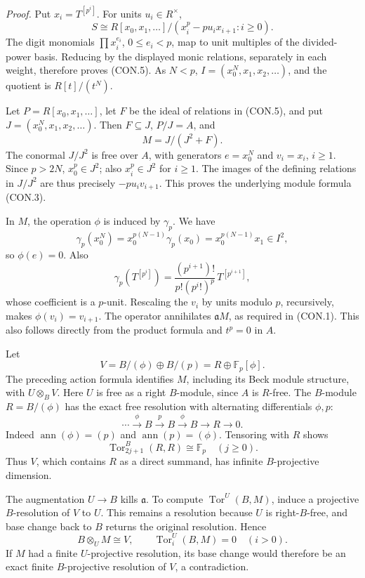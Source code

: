 \emph{Proof.}
Put \(x_i=T^{[p^i]}\). For units \(u_i\in R^\times\),
\[
 S\cong
 R[x_0,x_1,\ldots]/(x_i^p-pu_i x_{i+1}:i\ge0).
 \tag{CON.5}
\]
The digit monomials \(\prod x_i^{e_i}\), \(0\le e_i<p\), map to
unit multiples of the divided-power basis. Reducing by the displayed
monic relations, separately in each weight, therefore proves (CON.5).
As \(N<p\),
\(I=(x_0^N,x_1,x_2,\ldots)\), and the quotient is \(R[t]/(t^N)\).

Let \(P=R[x_0,x_1,\ldots]\), let \(F\) be the ideal of relations in
(CON.5), and put \(J=(x_0^N,x_1,x_2,\ldots)\).
Then \(F\subseteq J\), \(P/J=A\), and
\[
 M=J/(J^2+F).
\]
The conormal \(J/J^2\) is free over \(A\), with generators
\(e=x_0^N\) and \(v_i=x_i\), \(i\ge1\). Since \(p>2N\),
\(x_0^p\in J^2\); also \(x_i^p\in J^2\) for \(i\ge1\).
The images of the defining relations in \(J/J^2\) are thus precisely
\(-pu_i v_{i+1}\). This proves the underlying module formula (CON.3).

In \(M\), the operation \(\phi\) is induced by \(\gamma_p\). We have
\[
 \gamma_p(x_0^N)=x_0^{p(N-1)}\gamma_p(x_0)
                =x_0^{p(N-1)}x_1\in I^2,
\]
so \(\phi(e)=0\). Also
\[
 \gamma_p(T^{[p^i]})
   =\frac{(p^{i+1})!}{p!(p^i!)^p}\,T^{[p^{i+1}]},
\]
whose coefficient is a \(p\)-unit. Rescaling the \(v_i\) by units
modulo \(p\), recursively, makes \(\phi(v_i)=v_{i+1}\).
The operator annihilates \(\mathfrak a M\), as required in (CON.1).
This also follows directly from the product formula and \(t^p=0\)
in \(A\).

Let
\[
 V=B/(\phi)\oplus B/(p)=R\oplus\mathbb F_p[\phi].
\]
The preceding action formula identifies \(M\), including its Beck
module structure, with \(U\otimes_B V\). Here \(U\) is free as a
right \(B\)-module, since \(A\) is \(R\)-free. The \(B\)-module
\(R=B/(\phi)\) has the exact free resolution with alternating
differentials \(\phi,p\):
\[
 \cdots\xrightarrow{\phi}B\xrightarrow{p}B
 \xrightarrow{\phi}B\longrightarrow R\longrightarrow0.
 \tag{CON.6}
\]
Indeed \(\operatorname{ann}(\phi)=(p)\) and
\(\operatorname{ann}(p)=(\phi)\). Tensoring with \(R\) shows
\[
 \operatorname{Tor}_{2j+1}^B(R,R)\cong\mathbb F_p
 \quad(j\ge0).
\]
Thus \(V\), which contains \(R\) as a direct summand, has infinite
\(B\)-projective dimension.

The augmentation \(U\to B\) kills \(\mathfrak a\). To compute
\(\operatorname{Tor}^U(B,M)\), induce a projective \(B\)-resolution
of \(V\) to \(U\). This remains a resolution because \(U\) is
right-\(B\)-free, and base change back to \(B\) returns the original
resolution. Hence
\[
 B\otimes_U M\cong V,\qquad
 \operatorname{Tor}_i^U(B,M)=0\quad(i>0).
\]
If \(M\) had a finite \(U\)-projective resolution, its base change
would therefore be an exact finite \(B\)-projective resolution of
\(V\), a contradiction.

